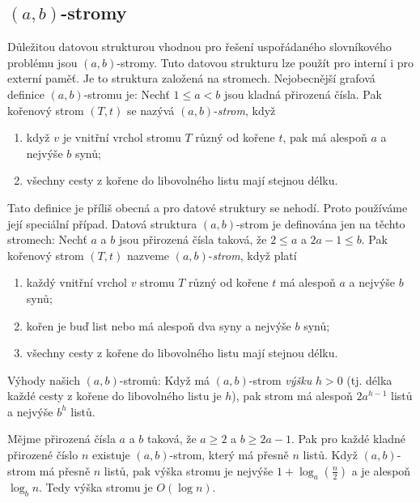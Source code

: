\documentclass[a4paper,12pt]{article}
\begin{document}
\subsection{$(a,b)$-stromy}

Důležitou datovou strukturou vhodnou pro 
řešení uspořá\-dané\-ho slovní\-ko\-vé\-ho problému jsou 
$(a,b)$-stromy. Tuto datovou strukturu lze použít pro interní i 
pro externí paměť. Je to struktura založená na stromech. 
Nejobecnější grafová defini\-ce $(a,b)$-stromu je:\newline 
Nechť $1\le a<b$ jsou kladná přirozená čísla. Pak kořenový 
strom $(T,t)$ se nazývá $(a,b)$-\emph{strom}, když 
\begin{enumerate}
\item
když $v$ je vnitřní vrchol stromu $T$ různý od 
kořene $t$, pak má alespoň $a$ a nejvýše $b$ synů;
\item
všechny cesty z kořene do libovolného listu mají 
stejnou délku.
\end{enumerate}
Tato definice je příliš obecná a pro datové struktury se 
nehodí. Proto používáme její speciální případ. Datová 
struktura $(a,b)$-strom je definována jen na těchto stromech: 
Nechť $a$ a $b$ jsou přirozená čísla taková, že $
2\le a$ a 
$2a-1\le b$. Pak kořenový 
strom $(T,t)$ nazveme $(a,b)$-\emph{strom}, když platí 
\begin{enumerate}
\item
každý vnitřní vrchol $v$ stromu $T$ různý od 
kořene $t$ má alespoň $a$ a nejvýše $b$ synů;
\item
kořen je buď list nebo má alespoň dva syny a nejvýše $
b$ 
synů;
\item
všechny cesty z kořene do libovolného listu mají 
stejnou délku.
\end{enumerate}

Výhody našich $(a,b)$-stromů:\newline 
Když má $(a,b)$-strom \emph{výšku} $h>0$ (tj. délka každé 
cesty z kořene do libovolného listu je $h$), pak 
strom má alespoň $2a^{h-1}$ listů a nejvýše $b^
h$ 
listů.

\begin{tvrzeni}Mějme přirozená čísla $a$ a $
b$ taková, 
že $a\ge 2$ a $b\ge 2a-1$. Pak pro každé kladné přirozené 
číslo $n$ existuje $(a,b)$-strom, který má přesně $
n$ 
listů. Když $(a,b)$-strom má přesně $n$ 
listů, pak výška stromu je nejvýše $1+\log_a(\frac 
n2)$ a 
je alespoň $\log_bn$. Tedy výška stromu je $O(\log n)$.
\end{tvrzeni}
\end{document}
